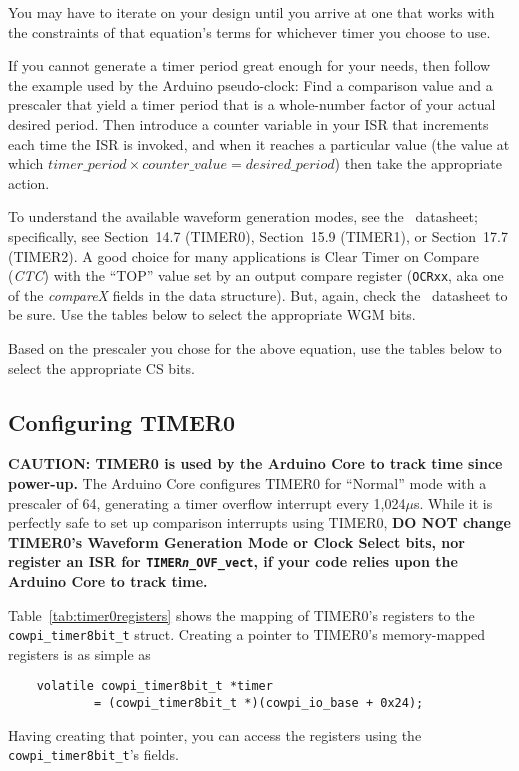 You may have to iterate on your design until you arrive at one that works with the constraints of that equation's terms for whichever timer you choose to use.

If you cannot generate a timer period great enough for your needs, then follow the example used by the Arduino pseudo-clock:
Find a comparison value and a prescaler that yield a timer period that is a whole-number factor of your actual desired period.
Then introduce a counter variable in your ISR that increments each time the ISR is invoked, and when it reaches a particular value (the value at which $timer\_period \times counter\_value = desired\_period$) then take the appropriate action.

To understand the available waveform generation modes, see the \microcontroller\ datasheet;\cite{ATmega328P}
specifically, see Section~14.7 (TIMER0), Section~15.9 (TIMER1), or Section~17.7 (TIMER2).
A good choice for many applications is Clear Timer on Compare (\textit{CTC}) with the ``TOP'' value set by an output compare register (\texttt{OCRxx}, aka one of the \textit{compareX} fields in the data structure).
But, again, check the \microcontroller\ datasheet to be sure.
Use the tables below to select the appropriate WGM bits.

Based on the prescaler you chose for the above equation, use the tables below to select the appropriate CS bits.

\subsection{Configuring TIMER0}

\textbf{CAUTION: TIMER0 is used by the Arduino Core to track time since power-up.}
The Arduino Core configures TIMER0 for ``Normal'' mode with a prescaler of 64, generating a timer overflow interrupt every 1,024$\mu$s.
While it is perfectly safe to set up comparison interrupts using TIMER0, \textbf{DO NOT change TIMER0's Waveform Generation Mode or Clock Select bits, nor register an ISR for \texttt{TIMER\textit{n}\_OVF\_vect}, if your code relies upon the Arduino Core to track time.}

Table~\ref{tab:timer0registers} shows the mapping of TIMER0's registers to the \lstinline{cowpi_timer8bit_t} struct.
Creating a pointer to TIMER0's memory-mapped registers is as simple as
\begin{lstlisting}
    volatile cowpi_timer8bit_t *timer
            = (cowpi_timer8bit_t *)(cowpi_io_base + 0x24);
\end{lstlisting}
Having creating that pointer, you can access the registers using the \lstinline{cowpi_timer8bit_t}'s fields.

